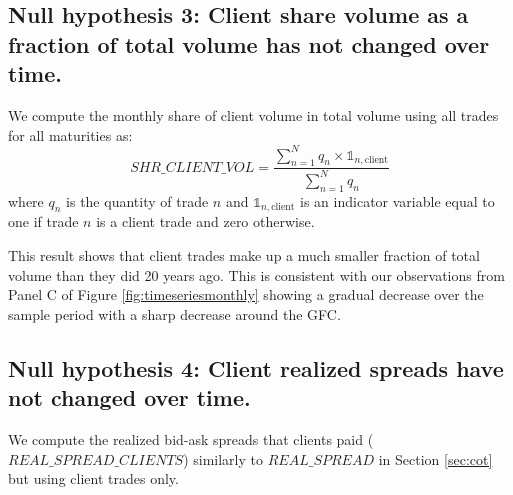 \documentclass[hidelinks, 11pt]{article}
\begin{document}


\subsection{Null hypothesis 3: Client share volume as a fraction of total volume has not changed over time.}

We compute the monthly share of client volume in total volume using all trades for all maturities as:
\begin{equation}
SHR\_CLIENT\_VOL  = \frac{\sum_{n=1}^N q_n \times \mathds{1}_{n,\text{client}}}{\sum_{n=1}^N q_n }
\end{equation}
where $q_n$ is the quantity of trade $n$ and $\mathds{1}_{n,\text{client}}$ is an indicator variable equal to one if trade $n$ is a client trade and zero otherwise.


 

This result shows that client trades make up a much smaller fraction of total volume than they did 20 years ago. This is consistent with our observations from Panel C of Figure \ref{fig:timeseriesmonthly} showing a gradual decrease over the sample period with a sharp decrease around the GFC.


\subsection{Null hypothesis 4: Client realized spreads have not changed over time.}\label{sec:cot_clients}


We compute the realized bid-ask spreads that clients paid ($REAL\_SPREAD\_CLIENTS$) similarly to $REAL\_SPREAD$ in Section \ref{sec:cot} but using client trades only.
\end{document}
